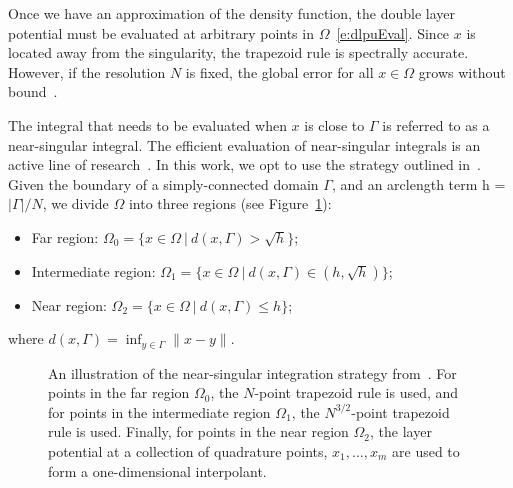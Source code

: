 \documentclass[final]{siamltex}
\begin{document}
Once we have an approximation of the density function, the double layer
potential must be evaluated at arbitrary points in
$\Omega$~\eqref{e:dlpuEval}.  Since $x$ is located away from the
singularity, the trapezoid rule is spectrally accurate.  However, if the
resolution $N$ is fixed, the global error for all $x \in \Omega$ grows
without bound~\cite{bir:yin:zor2006}.

The integral that needs to be evaluated when $x$ is close to $\Gamma$ is
referred to as a near-singular integral.  The efficient evaluation of
near-singular integrals is an active line of
research~\cite{hel2013,hel:oja2008,klo:bar:gre:one2012}.  In this work,
we opt to use the strategy outlined in~\cite{bir:yin:zor2006}.  Given
the boundary of a simply-connected domain $\Gamma$, and an arclength
term h = $|\Gamma|/N$, we divide $\Omega$ into three regions (see
Figure~\ref{f:nearsing}):
\begin{itemize}
  \item Far region: $\Omega_{0} = \{x \in \Omega \:|\: d(x,\Gamma) >
  \sqrt{h}\}$;

  \item Intermediate region: $\Omega_{1} = \{x \in \Omega \:|\:
  d(x,\Gamma) \in (h,\sqrt{h})\}$;

  \item Near region: $\Omega_{2}= \{x \in \Omega \:|\: d(x,\Gamma) \leq
  h\}$;
\end{itemize}
where $d(x,\Gamma) = \inf_{y \in \Gamma} \|x - y\|.$ 
\begin{figure}[htps]
\centering

\caption{\label{f:nearsing} An illustration of the near-singular
integration strategy from~\cite{bir:yin:zor2006}.  For points in the
far region $\Omega_{0}$, the $N$-point trapezoid rule is used, and for
points in the intermediate region $\Omega_{1}$, the $N^{3/2}$-point
trapezoid rule is used.  Finally, for points in the near region
$\Omega_{2}$, the layer potential at a collection of quadrature points,
$x_{1},\ldots,x_{m}$ are used to form a one-dimensional interpolant.}
\end{figure}
\end{document}
